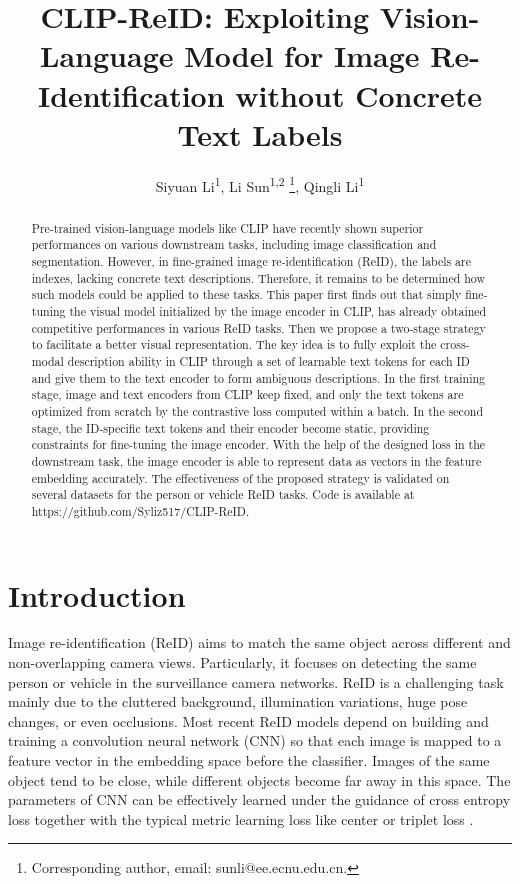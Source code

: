 \documentclass[letterpaper]{article} \usepackage{aaai23}  \usepackage{times}  \usepackage{helvet}  \usepackage{courier}  \usepackage[hyphens]{url}  \usepackage{graphicx} \urlstyle{rm} \def\UrlFont{\rm}  \usepackage{natbib}  \usepackage{caption} \frenchspacing  \setlength{\pdfpagewidth}{8.5in}  \setlength{\pdfpageheight}{11in}  \usepackage{algorithm}
\title{CLIP-ReID: Exploiting Vision-Language Model for Image Re-Identification without Concrete Text Labels}
\author {
Siyuan Li\textsuperscript{\rm 1},
    Li Sun\textsuperscript{\rm 1,\rm 2} \thanks{Corresponding author, email: sunli@ee.ecnu.edu.cn. },
    Qingli Li\textsuperscript{\rm 1}
}
\begin{document}
\maketitle

\begin{abstract}
Pre-trained vision-language models like CLIP have recently shown superior performances on various downstream tasks, including image classification and segmentation. However, in fine-grained image re-identification (ReID), the labels are indexes, lacking concrete text descriptions. Therefore, it remains to be determined how such models could be applied to these tasks. This paper first finds out that simply fine-tuning the visual model initialized by the image encoder in CLIP, has already obtained competitive performances in various ReID tasks. Then we propose a two-stage strategy to facilitate a better visual representation. The key idea is to fully exploit the cross-modal description ability in CLIP through a set of learnable text tokens for each ID and give them to the text encoder to form ambiguous descriptions. In the first training stage, image and text encoders from CLIP keep fixed, and only the text tokens are optimized from scratch by the contrastive loss computed within a batch. In the second stage, the ID-specific text tokens and their encoder become static, providing constraints for fine-tuning the image encoder. With the help of the designed loss in the downstream task, the image encoder is able to represent data as vectors in the feature embedding accurately. The effectiveness of the proposed strategy is validated on several datasets for the person or vehicle ReID tasks. Code is available at https://github.com/Syliz517/CLIP-ReID.

\end{abstract}

\section{Introduction}
Image re-identification (ReID) aims to match the same object across different and non-overlapping camera views. Particularly, it focuses on detecting the same person or vehicle in the surveillance camera networks. ReID is a challenging task mainly due to the cluttered background, illumination variations, huge pose changes, or even occlusions. Most recent ReID models depend on building and training a convolution neural network (CNN) so that each image is mapped to a feature vector in the embedding space before the classifier. Images of the same object tend to be close, while different objects become far away in this space. The parameters of CNN can be effectively learned under the guidance of cross entropy loss together with the typical metric learning loss like center or triplet loss \cite{Triplet}. 
\end{document}

